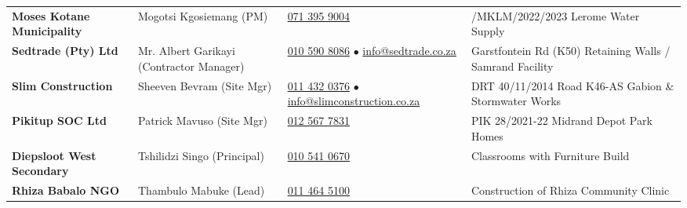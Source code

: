 \documentclass[a4paper,11pt]{article}
\begin{document}
\begin{tabularx}{\textwidth}{@{}p{3.8cm} p{2.8cm} p{3.4cm} X@{}}
\rowcolor{mhbluelight}
\fontsize{7.6pt}{9.4pt}\selectfont\bfseries Moses Kotane Municipality & \fontsize{7.6pt}{9.4pt}\selectfont Mogotsi Kgosiemang (PM) & \fontsize{7.6pt}{9.4pt}\selectfont \href{tel:0713959004}{071 395 9004} & \fontsize{7.6pt}{9.4pt}\selectfont 014/MKLM/2022/2023 Lerome Water Supply \\
\fontsize{7.6pt}{9.4pt}\selectfont\bfseries Sedtrade (Pty) Ltd & \fontsize{7.6pt}{9.4pt}\selectfont Mr. Albert Garikayi (Contractor Manager) & \fontsize{7.6pt}{9.4pt}\selectfont \href{tel:0105908086}{010 590 8086} $\bullet$ \href{mailto:info@sedtrade.co.za}{info@sedtrade.co.za} & \fontsize{7.6pt}{9.4pt}\selectfont Garstfontein Rd (K50) Retaining Walls / Samrand Facility \\
\rowcolor{mhbluelight}
\fontsize{7.6pt}{9.4pt}\selectfont\bfseries Slim Construction & \fontsize{7.6pt}{9.4pt}\selectfont Sheeven Bevram (Site Mgr) & \fontsize{7.6pt}{9.4pt}\selectfont \href{tel:0114320376}{011 432 0376} $\bullet$ \href{mailto:info@slimconstruction.co.za}{info@slimconstruction.co.za} & \fontsize{7.6pt}{9.4pt}\selectfont DRT 40/11/2014 Road K46-AS Gabion \& Stormwater Works \\
\fontsize{7.6pt}{9.4pt}\selectfont\bfseries Pikitup SOC Ltd & \fontsize{7.6pt}{9.4pt}\selectfont Patrick Mavuso (Site Mgr) & \fontsize{7.6pt}{9.4pt}\selectfont \href{tel:0125677831}{012 567 7831} & \fontsize{7.6pt}{9.4pt}\selectfont PIK 28/2021-22 Midrand Depot Park Homes \\
\rowcolor{mhbluelight}
\fontsize{7.6pt}{9.4pt}\selectfont\bfseries Diepsloot West Secondary & \fontsize{7.6pt}{9.4pt}\selectfont Tshilidzi Singo (Principal) & \fontsize{7.6pt}{9.4pt}\selectfont \href{tel:0105410670}{010 541 0670} & \fontsize{7.6pt}{9.4pt}\selectfont 4 Classrooms with Furniture Build \\
\fontsize{7.6pt}{9.4pt}\selectfont\bfseries Rhiza Babalo NGO & \fontsize{7.6pt}{9.4pt}\selectfont Thambulo Mabuke (Lead) & \fontsize{7.6pt}{9.4pt}\selectfont \href{tel:0114645100}{011 464 5100} & \fontsize{7.6pt}{9.4pt}\selectfont Construction of Rhiza Community Clinic \\
\end{tabularx}
\renewcommand{\arraystretch}{1}

\clearpage

\thispagestyle{empty}
\hypertarget{sec:tenderpack}{}
\end{document}

